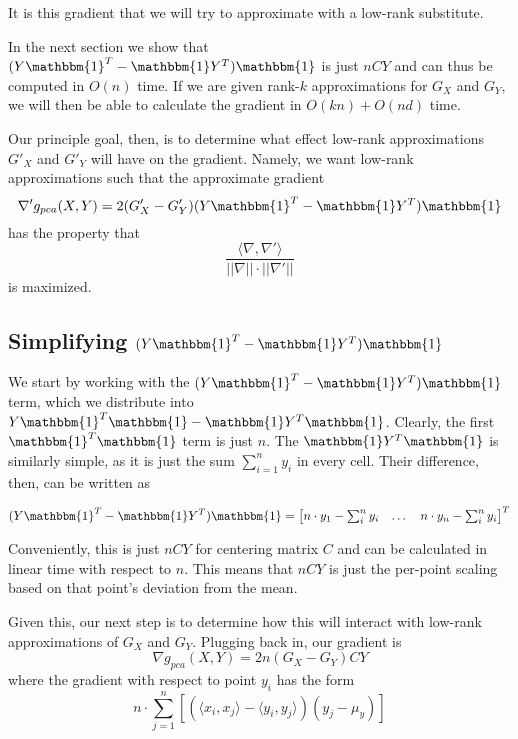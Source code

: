 \documentclass{article}
\theoremstyle{definition}
\begin{document}
It is this gradient that we will try to approximate with a low-rank substitute.

In the next section we show that $(Y \mathbbm{1}^T - \mathbbm{1} Y^T) \mathbbm{1}$ is just $nCY$ and can thus be computed in $O(n)$ time. If we are given
rank-$k$ approximations for $G_X$ and $G_Y$, we will then be able to calculate the gradient in $O(kn) + O(nd)$ time.

Our principle goal, then, is to determine what effect low-rank approximations $G'_X$ and $G'_Y$ will have on the gradient. Namely, we want low-rank
approximations such that the approximate gradient
\[ \nabla' g_{pca}(X, Y) = 2(G'_X - G'_Y) (Y \mathbbm{1}^T - \mathbbm{1} Y^T) \mathbbm{1} \]
has the property that
\[ \dfrac{\langle \nabla , \nabla' \rangle}{||\nabla|| \cdot ||\nabla'||} \]
is maximized.

\subsection{Simplifying $(Y \mathbbm{1}^T - \mathbbm{1} Y^T) \mathbbm{1}$}
We start by working with the $(Y \mathbbm{1}^T - \mathbbm{1} Y^T) \mathbbm{1}$ term, which we distribute into $Y \mathbbm{1}^T \mathbbm{1} - \mathbbm{1} Y^T
\mathbbm{1}$. Clearly, the first $\mathbbm{1}^T \mathbbm{1}$ term is just $n$. The $\mathbbm{1} Y^T \mathbbm{1}$ is similarly simple, as it is just the sum $\sum_{i=1}^n y_{i}$ in every cell. Their difference, then, can be written as

\begin{equation} \label{scalar_matrix}
(Y \mathbbm{1}^T - \mathbbm{1} Y^T) \mathbbm{1} = 
\begin{bmatrix}
    n \cdot y_1 - \sum_i^n y_i & \dots & n \cdot y_n - \sum_i^n y_i
\end{bmatrix}^T
\end{equation}

Conveniently, this is just $nCY$ for centering matrix $C$ and can be calculated in linear time with respect to $n$. This means that $nCY$ is just the per-point scaling based on that point's deviation from the mean.

Given this, our next step is to determine how this will interact with low-rank approximations of $G_X$ and $G_Y$. Plugging back in, our gradient is
\[ \nabla g_{pca}(X, Y) = 2n(G_X - G_Y)CY \]
where the gradient with respect to point $y_i$ has the form
\[ n \cdot \sum_{j = 1}^n \left[ \left( \langle x_i, x_j \rangle - \langle y_i, y_j \rangle \right) (y_j - \mu_y) \right] \]
\end{document}

